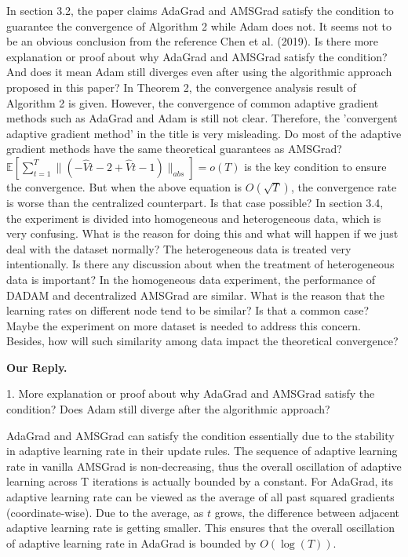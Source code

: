 \documentclass{article} %
\begin{document}
In section 3.2, the paper claims AdaGrad and AMSGrad satisfy the condition to guarantee the convergence of Algorithm 2 while Adam does not. It seems not to be an obvious conclusion from the reference Chen et al. (2019). Is there more explanation or proof about why AdaGrad and AMSGrad satisfy the condition? And does it mean Adam still diverges even after using the algorithmic approach proposed in this paper?
In Theorem 2, the convergence analysis result of Algorithm 2 is given. However, the convergence of common adaptive gradient methods such as AdaGrad and Adam is still not clear. Therefore, the 'convergent adaptive gradient method' in the title is very misleading. Do most of the adaptive gradient methods have the same theoretical guarantees as AMSGrad?
$ \mathbb{E}[\sum_{t=1}^T \lVert (-\hat{V}{t-2} + \hat{V}{t-1}) \rVert_{abs}] = o(T)$ is the key condition to ensure the convergence. But when the above equation is $O(\sqrt{T})$, the convergence rate is worse than the centralized counterpart. Is that case possible?
In section 3.4, the experiment is divided into homogeneous and heterogeneous data, which is very confusing. What is the reason for doing this and what will happen if we just deal with the dataset normally? The heterogeneous data is treated very intentionally. Is there any discussion about when the treatment of heterogeneous data is important?
In the homogeneous data experiment, the performance of DADAM and decentralized AMSGrad are similar. What is the reason that the learning rates on different node tend to be similar? Is that a common case? Maybe the experiment on more dataset is needed to address this concern. Besides, how will such similarity among data impact the theoretical convergence?

\textbf{Our Reply.}

1. More explanation or proof about why AdaGrad and AMSGrad satisfy the condition? Does Adam still diverge after the algorithmic approach?

AdaGrad and AMSGrad can satisfy the condition essentially due to the stability in adaptive learning rate in their update rules. The sequence of adaptive learning rate in vanilla AMSGrad is non-decreasing, thus the overall oscillation of adaptive learning across T iterations is actually bounded by a constant. For AdaGrad, its adaptive learning rate can be viewed as the average of all past squared gradients (coordinate-wise). Due to the average, as $t$ grows, the difference between adjacent adaptive learning rate is getting smaller. This ensures that the overall oscillation of adaptive learning rate in AdaGrad is bounded by $O(\log(T))$.
\end{document}
